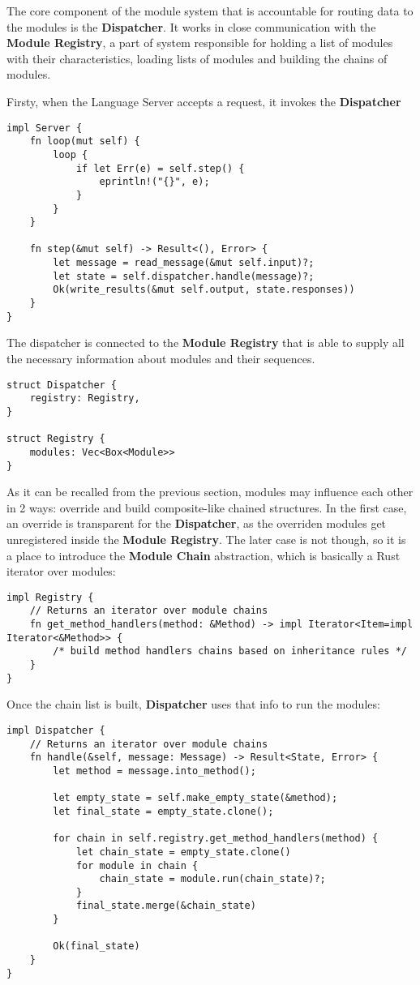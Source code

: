 The core component of the module system that is accountable for routing data to the modules is the
\textbf{Dispatcher}. It works in close communication with the \textbf{Module Registry}, a part of system responsible for
holding a list of modules with their characteristics, loading lists of modules and building the chains of modules.

Firsty, when the Language Server accepts a request, it invokes the \textbf{Dispatcher}
\begin{verbatim}
impl Server {
    fn loop(mut self) {
        loop {
            if let Err(e) = self.step() {
                eprintln!("{}", e);
            }
        }
    }

    fn step(&mut self) -> Result<(), Error> {
        let message = read_message(&mut self.input)?;
        let state = self.dispatcher.handle(message)?;
        Ok(write_results(&mut self.output, state.responses))
    }
}
\end{verbatim}

The dispatcher is connected to the \textbf{Module Registry} that is able to supply
all the necessary information about modules and their sequences.
\begin{verbatim}
struct Dispatcher {
    registry: Registry,
}

struct Registry {
    modules: Vec<Box<Module>>
}
\end{verbatim}

As it can be recalled from the previous section, modules may influence each other in 2 ways:
override and build composite-like chained structures. In the first case, an override is
transparent for the \textbf{Dispatcher}, as the overriden modules
get unregistered inside the \textbf{Module Registry}.
The later case is not though, so it is a place to introduce the \textbf{Module Chain} abstraction,
which is basically a Rust iterator over modules:

\begin{verbatim}
impl Registry {
    // Returns an iterator over module chains
    fn get_method_handlers(method: &Method) -> impl Iterator<Item=impl Iterator<&Method>> {
        /* build method handlers chains based on inheritance rules */
    }
}
\end{verbatim}

Once the chain list is built, \textbf{Dispatcher} uses that info to run the modules:
\begin{verbatim}
impl Dispatcher {
    // Returns an iterator over module chains
    fn handle(&self, message: Message) -> Result<State, Error> {
        let method = message.into_method();

        let empty_state = self.make_empty_state(&method);
        let final_state = empty_state.clone();

        for chain in self.registry.get_method_handlers(method) {
            let chain_state = empty_state.clone()
            for module in chain {
                chain_state = module.run(chain_state)?;
            }
            final_state.merge(&chain_state)
        }

        Ok(final_state)
    }
}
\end{verbatim}

